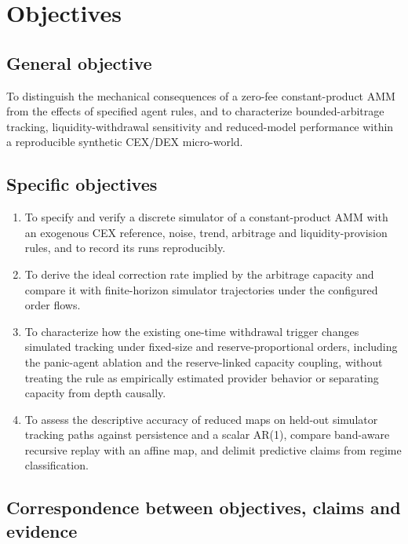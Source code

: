 \chapter{Objectives}
\label{cap:objetivos}

\section{General objective}

To distinguish the mechanical consequences of a zero-fee constant-product AMM from the effects of specified agent rules, and to characterize bounded-arbitrage tracking, liquidity-withdrawal sensitivity and reduced-model performance within a reproducible synthetic CEX/DEX micro-world.

\section{Specific objectives}

\begin{enumerate}[label=\textbf{OE\arabic*.}, leftmargin=3em]
  \item To specify and verify a discrete simulator of a constant-product AMM with an exogenous CEX reference, noise, trend, arbitrage and liquidity-provision rules, and to record its runs reproducibly.
  \item To derive the ideal correction rate implied by the arbitrage capacity and compare it with finite-horizon simulator trajectories under the configured order flows.
  \item To characterize how the existing one-time withdrawal trigger changes simulated tracking under fixed-size and reserve-proportional orders, including the panic-agent ablation and the reserve-linked capacity coupling, without treating the rule as empirically estimated provider behavior or separating capacity from depth causally.
  \item To assess the descriptive accuracy of reduced maps on held-out simulator tracking paths against persistence and a scalar AR(1), compare band-aware recursive replay with an affine map, and delimit predictive claims from regime classification.
\end{enumerate}

\section{Correspondence between objectives, claims and evidence}

